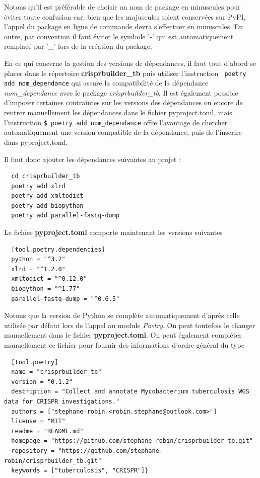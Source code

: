 \documentclass[twoside,a4paper,11pt,frenchb,openany]{report}
\begin{document}
Notons qu'il est préférable de choisir un nom de package en minuscules pour éviter toute confusion car, bien que les majuscules soient conservées sur PyPI, l'appel du package en ligne de commande devra s'effectuer en minuscules. En outre, par convention il faut éviter le symbole '-' qui est automatiquement remplacé par '\_' lors de la création du package.

En ce qui concerne la gestion des versions de dépendances, il faut tout d'abord se placer dans le répertoire \textbf{crisprbuilder\_tb} puis utiliser l’instruction
\texttt{  poetry add nom\_dependance}  
qui assure la compatibilité de la dépendance \textit{nom\_dependance} avec le package \textit{crisprbuilder\_tb}. Il est également possible d’imposer certaines contraintes sur les versions des dépendances ou encore de rentrer manuellement les dépendances dans le fichier pyproject.toml, mais l’instruction 
\texttt{\$ poetry add nom\_dependance} 
offre l’avantage de chercher automatiquement une version compatible de la dépendance, puis de l’inscrire dans pyproject.toml.

Il faut donc ajouter les dépendances suivantes au projet :
\begin{verbatim}  cd crisprbuilder_tb 
  poetry add xlrd 
  poetry add xmltodict 
  poetry add biopython
  poetry add parallel-fastq-dump \end{verbatim}

Le fichier \textbf{pyproject.toml} comporte maintenant les versions suivantes

\begin{verbatim}  [tool.poetry.dependencies]
  python = "^3.7"
  xlrd = "^1.2.0"
  xmltodict = "^0.12.0"
  biopython = "^1.77"
  parallel-fastq-dump = "^0.6.5"\end{verbatim}

Notons que la version de Python se complète automatiquement d'après celle utilisée par défaut lors de l'appel au module \textit{Poetry}. On peut toutefois le changer manuellement dans le fichier \textbf{pyproject.toml}. On peut également compléter manuellement ce fichier pour fournir des informations d'ordre général du type

\begin{verbatim}  [tool.poetry]
  name = "crisprbuilder_tb"
  version = "0.1.2"
  description = "Collect and annotate Mycobacterium tuberculosis WGS data for CRISPR investigations."
  authors = ["stephane-robin <robin.stephane@outlook.com>"]
  license = "MIT"
  readme = "README.md"
  homepage = "https://github.com/stephane-robin/crisprbuilder_tb.git"
  repository = "https://github.com/stephane-robin/crisprbuilder_tb.git"
  keywords = ["tuberculosis", "CRISPR"]}\end{verbatim}
\end{document}
